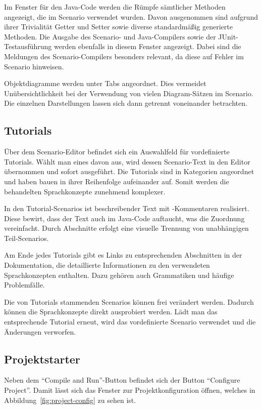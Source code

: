 Im Fenster für den Java-Code werden die Rümpfe sämtlicher Methoden angezeigt, die im Scenario verwendet wurden.
Davon ausgenommen sind aufgrund ihrer Trivialität Getter und Setter sowie diverse standardmäßig generierte Methoden.
Die Ausgabe des Scenario- und Java-Compilers sowie der JUnit-Testausführung werden ebenfalls in diesem Fenster angezeigt.
Dabei sind die Meldungen des Scenario-Compilers besonders relevant, da diese auf Fehler im Scenario hinweisen.

Objektdiagramme werden unter Tabs angeordnet.
Dies vermeidet Unübersichtlichkeit bei der Verwendung von vielen Diagram-Sätzen im Scenario.
Die einzelnen Darstellungen lassen sich dann getrennt voneinander betrachten.

\subsection{Tutorials}\label{subsec:tutorials}

Über dem Scenario-Editor befindet sich ein Auswahlfeld für vordefinierte Tutorials.
Wählt man eines davon aus, wird dessen Scenario-Text in den Editor übernommen und sofort ausgeführt.
Die Tutorials sind in Kategorien angeordnet und haben bauen in ihrer Reihenfolge aufeinander auf.
Somit werden die behandelten Sprachkonzepte zunehmend komplexer.

In den Tutorial-Scenarios ist beschreibender Text mit \code{//}-Kommentaren realisiert.
Diese bewirt, dass der Text auch im Java-Code auftaucht, was die Zuordnung vereinfacht.
Durch Abschnitte erfolgt eine visuelle Trennung von unabhängigen Teil-Scenarios.

Am Ende jedes Tutorials gibt es Links zu entsprechenden Abschnitten in der Dokumentation,
die detaillierte Informationen zu den verwendeten Sprachkonzepten enthalten.
Dazu gehören auch Grammatiken und häufige Problemfälle.

Die von Tutorials stammenden Scenarios können frei verändert werden.
Dadurch können die Sprachkonzepte direkt ausprobiert werden.
Lädt man das entsprechende Tutorial erneut, wird das vordefinierte Scenario verwendet und die Änderungen verworfen.

\subsection{Projektstarter}\label{subsec:project-starter}

Neben dem ``Compile and Run''-Button befindet sich der Button ``Configure Project''.
Damit lässt sich das Fenster zur Projektkonfiguration öffnen, welches in Abbildung~\ref{fig:project-config} zu sehen ist.

